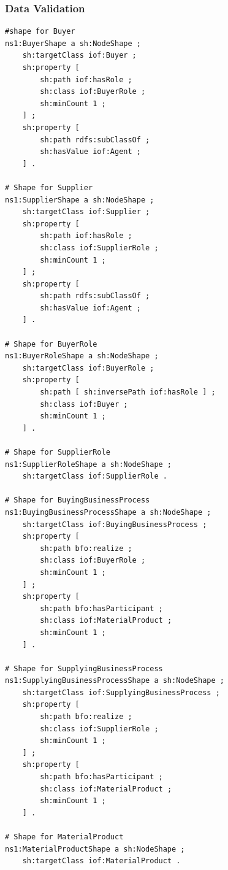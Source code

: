\subsubsection*{Data Validation}
\begin{verbatim}
#shape for Buyer
ns1:BuyerShape a sh:NodeShape ;
    sh:targetClass iof:Buyer ;
    sh:property [
        sh:path iof:hasRole ;
        sh:class iof:BuyerRole ;
        sh:minCount 1 ;
    ] ;
    sh:property [
        sh:path rdfs:subClassOf ;
        sh:hasValue iof:Agent ;
    ] .

# Shape for Supplier
ns1:SupplierShape a sh:NodeShape ;
    sh:targetClass iof:Supplier ;
    sh:property [
        sh:path iof:hasRole ;
        sh:class iof:SupplierRole ;
        sh:minCount 1 ;
    ] ;
    sh:property [
        sh:path rdfs:subClassOf ;
        sh:hasValue iof:Agent ;
    ] .

# Shape for BuyerRole
ns1:BuyerRoleShape a sh:NodeShape ;
    sh:targetClass iof:BuyerRole ;
    sh:property [
        sh:path [ sh:inversePath iof:hasRole ] ;
        sh:class iof:Buyer ;
        sh:minCount 1 ;
    ] .

# Shape for SupplierRole
ns1:SupplierRoleShape a sh:NodeShape ;
    sh:targetClass iof:SupplierRole .

# Shape for BuyingBusinessProcess
ns1:BuyingBusinessProcessShape a sh:NodeShape ;
    sh:targetClass iof:BuyingBusinessProcess ;
    sh:property [
        sh:path bfo:realize ;
        sh:class iof:BuyerRole ;
        sh:minCount 1 ;
    ] ;
    sh:property [
        sh:path bfo:hasParticipant ;
        sh:class iof:MaterialProduct ;
        sh:minCount 1 ;
    ] .

# Shape for SupplyingBusinessProcess
ns1:SupplyingBusinessProcessShape a sh:NodeShape ;
    sh:targetClass iof:SupplyingBusinessProcess ;
    sh:property [
        sh:path bfo:realize ;
        sh:class iof:SupplierRole ;
        sh:minCount 1 ;
    ] ;
    sh:property [
        sh:path bfo:hasParticipant ;
        sh:class iof:MaterialProduct ;
        sh:minCount 1 ;
    ] .

# Shape for MaterialProduct
ns1:MaterialProductShape a sh:NodeShape ;
    sh:targetClass iof:MaterialProduct .


\end{verbatim}